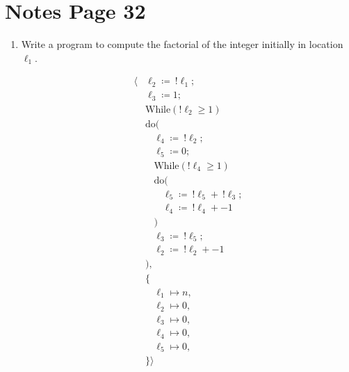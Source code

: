 \documentclass[10pt,\jkfside,a4paper]{article}
\begin{document}
\section{Notes Page 32}

\begin{enumerate}

\item Write a program to compute the factorial of the integer initially in
location $\ell_1$.

\[
\begin{split}
\langle&\ell_2 \coloneqq \ !\ell_1;\\
&\ell_{3} \coloneqq 1; \\
&\text{While}(!\ell_2 \geq 1) \\
&\text{do}( \\
&\ \ \ \ \ell_4 \coloneqq \ !\ell_2; \\
&\ \ \ \ \ell_5 \coloneqq 0; \\
&\ \ \ \ \text{While}(!\ell_4 \geq 1) \\
&\ \ \ \ \text{do}( \\
&\ \ \ \ \ \ \ \ \ell_5 \coloneqq \ !\ell_5 + \ !\ell_3; \\
&\ \ \ \ \ \ \ \ \ell_4 \coloneqq \ !\ell_4 + -1 \\
&\ \ \ \ ) \\
&\ \ \ \ \ell_3 \coloneqq \ !\ell_5; \\
&\ \ \ \ \ell_2 \coloneqq \ !\ell_2 + -1 \\
&), \\
&\{\\
&\ \ \ \ \ell_1 \mapsto n,\\
&\ \ \ \ \ell_2 \mapsto 0,\\
&\ \ \ \ \ell_3 \mapsto 0,\\
&\ \ \ \ \ell_4 \mapsto 0,\\
&\ \ \ \ \ell_5 \mapsto 0,\\
&\}\rangle
\end{split}
\]

\setcounter{enumi}{2}


\end{enumerate}
\end{document}
